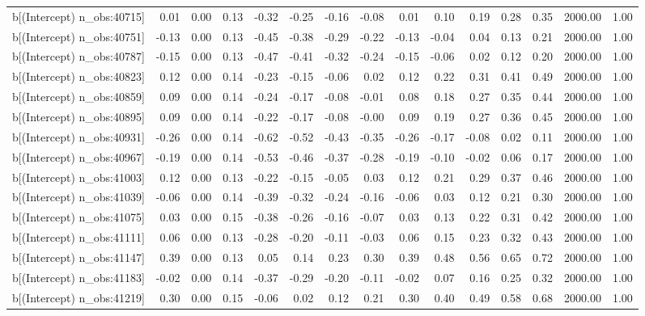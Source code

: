 \begin{table}[ht]
\begin{tabular}{rrrrrrrrrrrrrrr}
  b[(Intercept) n\_obs:40715] & 0.01 & 0.00 & 0.13 & -0.32 & -0.25 & -0.16 & -0.08 & 0.01 & 0.10 & 0.19 & 0.28 & 0.35 & 2000.00 & 1.00 \\ 
  b[(Intercept) n\_obs:40751] & -0.13 & 0.00 & 0.13 & -0.45 & -0.38 & -0.29 & -0.22 & -0.13 & -0.04 & 0.04 & 0.13 & 0.21 & 2000.00 & 1.00 \\ 
  b[(Intercept) n\_obs:40787] & -0.15 & 0.00 & 0.13 & -0.47 & -0.41 & -0.32 & -0.24 & -0.15 & -0.06 & 0.02 & 0.12 & 0.20 & 2000.00 & 1.00 \\ 
  b[(Intercept) n\_obs:40823] & 0.12 & 0.00 & 0.14 & -0.23 & -0.15 & -0.06 & 0.02 & 0.12 & 0.22 & 0.31 & 0.41 & 0.49 & 2000.00 & 1.00 \\ 
  b[(Intercept) n\_obs:40859] & 0.09 & 0.00 & 0.14 & -0.24 & -0.17 & -0.08 & -0.01 & 0.08 & 0.18 & 0.27 & 0.35 & 0.44 & 2000.00 & 1.00 \\ 
  b[(Intercept) n\_obs:40895] & 0.09 & 0.00 & 0.14 & -0.22 & -0.17 & -0.08 & -0.00 & 0.09 & 0.19 & 0.27 & 0.36 & 0.45 & 2000.00 & 1.00 \\ 
  b[(Intercept) n\_obs:40931] & -0.26 & 0.00 & 0.14 & -0.62 & -0.52 & -0.43 & -0.35 & -0.26 & -0.17 & -0.08 & 0.02 & 0.11 & 2000.00 & 1.00 \\ 
  b[(Intercept) n\_obs:40967] & -0.19 & 0.00 & 0.14 & -0.53 & -0.46 & -0.37 & -0.28 & -0.19 & -0.10 & -0.02 & 0.06 & 0.17 & 2000.00 & 1.00 \\ 
  b[(Intercept) n\_obs:41003] & 0.12 & 0.00 & 0.13 & -0.22 & -0.15 & -0.05 & 0.03 & 0.12 & 0.21 & 0.29 & 0.37 & 0.46 & 2000.00 & 1.00 \\ 
  b[(Intercept) n\_obs:41039] & -0.06 & 0.00 & 0.14 & -0.39 & -0.32 & -0.24 & -0.16 & -0.06 & 0.03 & 0.12 & 0.21 & 0.30 & 2000.00 & 1.00 \\ 
  b[(Intercept) n\_obs:41075] & 0.03 & 0.00 & 0.15 & -0.38 & -0.26 & -0.16 & -0.07 & 0.03 & 0.13 & 0.22 & 0.31 & 0.42 & 2000.00 & 1.00 \\ 
  b[(Intercept) n\_obs:41111] & 0.06 & 0.00 & 0.13 & -0.28 & -0.20 & -0.11 & -0.03 & 0.06 & 0.15 & 0.23 & 0.32 & 0.43 & 2000.00 & 1.00 \\ 
  b[(Intercept) n\_obs:41147] & 0.39 & 0.00 & 0.13 & 0.05 & 0.14 & 0.23 & 0.30 & 0.39 & 0.48 & 0.56 & 0.65 & 0.72 & 2000.00 & 1.00 \\ 
  b[(Intercept) n\_obs:41183] & -0.02 & 0.00 & 0.14 & -0.37 & -0.29 & -0.20 & -0.11 & -0.02 & 0.07 & 0.16 & 0.25 & 0.32 & 2000.00 & 1.00 \\ 
  b[(Intercept) n\_obs:41219] & 0.30 & 0.00 & 0.15 & -0.06 & 0.02 & 0.12 & 0.21 & 0.30 & 0.40 & 0.49 & 0.58 & 0.68 & 2000.00 & 1.00 \\ 

\end{tabular}
\end{table}
